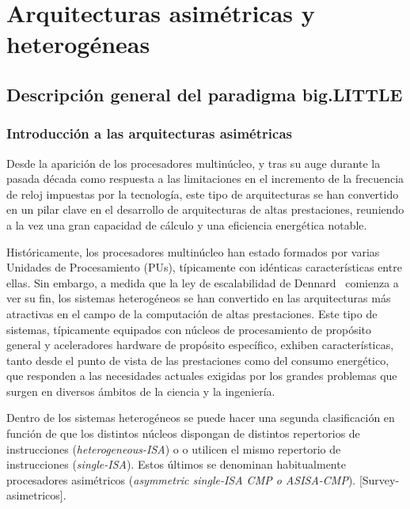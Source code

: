 \cleardoublepage

\chapter{Arquitecturas asimétricas y heterogéneas}
\label{ch:chapter2}

\section{Descripción general del paradigma big.LITTLE}

\subsection{Introducción a las arquitecturas asimétricas}
\label{sec:arch_asym}

Desde la aparición de los procesadores multinúcleo, y tras su auge durante la pasada
década como respuesta a las limitaciones en el incremento de la frecuencia de reloj
impuestas por la tecnología, este tipo de arquitecturas se han convertido en un pilar
clave en el desarrollo de arquitecturas de altas prestaciones, reuniendo a la vez
una gran capacidad de cálculo y una eficiencia energética notable.

Históricamente, los procesadores multinúcleo han estado formados por varias 
Unidades de Procesamiento (PUs), típicamente con idénticas características entre ellas.
Sin embargo, a medida que la ley de escalabilidad de Dennard~\cite{Den74} comienza a 
ver su fin, los sistemas heterogéneos se han convertido en las arquitecturas más 
atractivas en el campo de la computación de altas prestaciones. Este tipo de sistemas,
típicamente equipados con núcleos de procesamiento de propósito general y aceleradores
hardware de propósito específico, exhiben características, tanto desde el punto de vista
de las prestaciones como del consumo energético, que responden a las necesidades actuales
exigidas por los grandes problemas que surgen en diversos ámbitos de la ciencia y la
ingeniería.

Dentro de los sistemas heterogéneos se puede hacer una segunda clasificación en función de que los
distintos núcleos dispongan de distintos repertorios de instrucciones ({\em heterogeneous-ISA}) o
o utilicen el mismo repertorio de instrucciones ({\em single-ISA}). Estos últimos se denominan
habitualmente procesadores asimétricos ({\em asymmetric single-ISA CMP o ASISA-CMP}). [Survey-
asimetricos].

